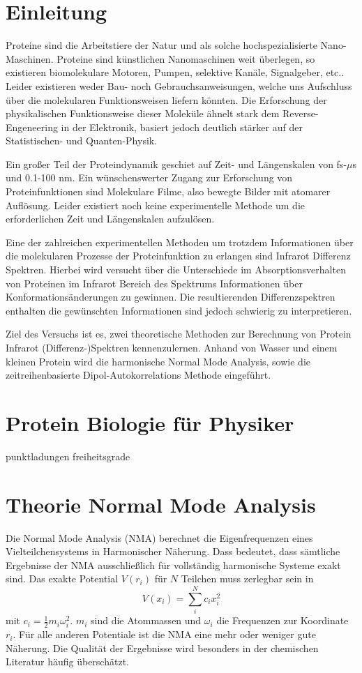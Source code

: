 \documentclass[a4paper,12pt]{article}
\begin{document}
\section*{Einleitung}
Proteine sind die Arbeitstiere der Natur und als solche hochspezialisierte Nano-Maschinen. 
Proteine sind k\"unstlichen Nanomaschinen weit überlegen, so existieren biomolekulare Motoren, Pumpen, selektive Kanäle, Signalgeber, etc.. 
Leider existieren weder Bau- noch Gebrauchsanweisungen, welche uns Aufschluss \"uber die molekularen Funktionsweisen liefern könnten. 
Die Erforschung der physikalischen Funktionsweise dieser Moleküle ähnelt stark dem Reverse-Engeneering in der Elektronik, basiert jedoch 
deutlich stärker auf der Statistischen- und Quanten-Physik.

Ein großer Teil der Proteindynamik geschiet auf Zeit- und L\"angenskalen von fs-$\mu$s und 0.1-100 nm. Ein w\"unschenswerter Zugang zur 
Erforschung von Proteinfunktionen sind Molekulare Filme, also bewegte Bilder mit atomarer Aufl\"osung. Leider existiert noch 
keine experimentelle Methode um die erforderlichen Zeit und L\"angenskalen aufzul\"osen.

Eine der zahlreichen experimentellen Methoden um trotzdem Informationen über die molekularen Prozesse der Proteinfunktion zu erlangen sind 
Infrarot Differenz Spektren. Hierbei wird versucht über die Unterschiede im Absorptionsverhalten von Proteinen im Infrarot Bereich des Spektrums 
Informationen über Konformationsänderungen zu gewinnen. Die resultierenden Differenzspektren enthalten die gewünschten Informationen sind 
jedoch schwierig zu interpretieren.

Ziel des Versuchs ist es, zwei theoretische Methoden zur Berechnung von Protein Infrarot (Differenz-)Spektren kennenzulernen. Anhand von Wasser 
und einem kleinen Protein wird die harmonische Normal Mode Analysis, sowie die zeitreihenbasierte Dipol-Autokorrelations Methode eingeführt. 

\section{Protein Biologie für Physiker}
punktladungen
freiheitsgrade

\section{Theorie Normal Mode Analysis}\label{nmasection}
Die Normal Mode Analysis (NMA) berechnet die Eigenfrequenzen eines Vielteilchensystems in Harmonischer Näherung. Dass bedeutet, dass sämtliche 
Ergebnisse der NMA ausschließlich für vollständig harmonische Systeme exakt sind. Das exakte Potential $V(r_i)$ für $N$ Teilchen muss zerlegbar 
sein in
\begin{equation}
 V(x_i)=\sum_i^N c_i x_i^2
\end{equation}
mit $c_i=\frac{1}{2}m_i \omega_i^2$. $m_i$ sind die Atommassen und $\omega_i$ die Frequenzen zur Koordinate $r_i$. Für alle anderen Potentiale ist 
die NMA eine mehr oder weniger gute Näherung. Die Qualität der Ergebnisse wird besonders in der chemischen Literatur häufig überschätzt.
\end{document}
